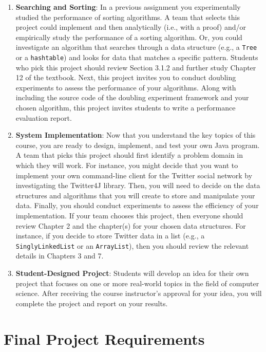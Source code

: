 \documentclass[11pt]{article}
\newcommand{\program}[1]{\lstinline{#1}}
\begin{document}
\begin{enumerate}
  \item {\bf Searching and Sorting}: In a previous assignment you experimentally
    studied the performance of sorting algorithms. A team that selects this
    project could implement and then analytically (i.e., with a proof) and/or
    empirically study the performance of a sorting algorithm. Or, you could
    investigate an algorithm that searches through a data structure (e.g., a
    \program{Tree} or a \program{hashtable}) and looks for data that matches a
    specific pattern. Students who pick this project should review Section 3.1.2
    and further study Chapter 12 of the textbook. Next, this project invites you
    to conduct doubling experiments to assess the performance of your
    algorithms. Along with including the source code of the doubling experiment
    framework and your chosen algorithm, this project invites students to write
    a performance evaluation report.

  \item {\bf System Implementation}: Now that you understand the key topics of
    this course, you are ready to design, implement, and test your own Java
    program. A team that picks this project should first identify a problem
    domain in which they will work. For instance, you might decide that you want
    to implement your own command-line client for the Twitter social network by
    investigating the Twitter4J library. Then, you will need to decide on the
    data structures and algorithms that you will create to store and manipulate
    your data. Finally, you should conduct experiments to assess the efficiency
    of your implementation. If your team chooses this project, then everyone
    should review Chapter 2 and the chapter(s) for your chosen data structures.
    For instance, if you decide to store Twitter data in a list (e.g., a
    \program{SinglyLinkedList} or an \program{ArrayList}), then you should
    review the relevant details in Chapters 3 and 7.

  \item {\bf Student-Designed Project}: Students will develop an idea for their
    own project that focuses on one or more real-world topics in the field of
    computer science. After receiving the course instructor's approval for your
    idea, you will complete the project and report on your results.

\end{enumerate}

\section*{Final Project Requirements}
\end{document}
